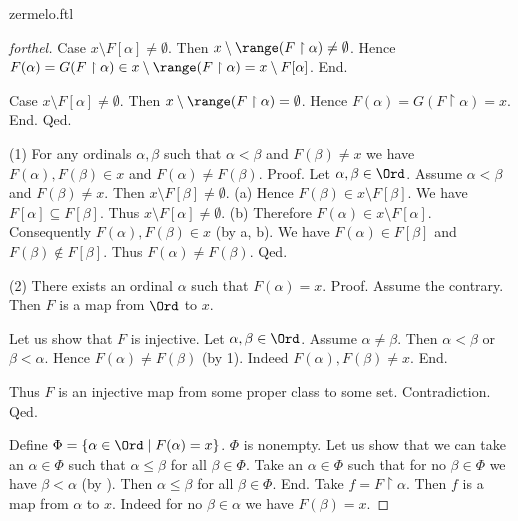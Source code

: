 \documentclass{naproche-library}
\begin{document}
\begin{smodule}{zermelo.ftl}
\begin{proof}[forthel]
      Case $x \setminus F[\alpha] \neq \emptyset$.
        Then $x \setminus \range(F \restriction \alpha) \neq \emptyset$.
        Hence $F(\alpha)
          = G(F \restriction \alpha)
          \in x \setminus \range(F \restriction \alpha)
          = x \setminus F[\alpha]$.
      End.

      Case $x \setminus F[\alpha] \neq \emptyset$.
        Then $x \setminus \range(F \restriction \alpha) = \emptyset$.
        Hence $F(\alpha)
          = G(F \restriction \alpha)
          = x$.
      End.
    Qed.

    (1) For any ordinals $\alpha, \beta$ such that $\alpha < \beta$ and $F(\beta) \neq x$ we have $F(\alpha), F(\beta) \in x$ and $F(\alpha) \neq F(\beta)$. \newline
    Proof.
      Let $\alpha, \beta \in \Ord$.
      Assume $\alpha < \beta$ and $F(\beta) \neq x$.
      Then $x \setminus F[\beta] \neq \emptyset$.
      (a) Hence $F(\beta) \in x \setminus F[\beta]$.
      We have $F[\alpha] \subseteq F[\beta]$.
      Thus $x \setminus F[\alpha] \neq \emptyset$.
      (b) Therefore $F(\alpha) \in x \setminus F[\alpha]$.
      Consequently $F(\alpha), F(\beta) \in x$ (by a, b).
      We have $F(\alpha) \in F[\beta]$ and $F(\beta) \notin F[\beta]$.
      Thus $F(\alpha) \neq F(\beta)$.
    Qed.

    (2) There exists an ordinal $\alpha$ such that $F(\alpha) = x$. \newline
    Proof.
      Assume the contrary.
      Then $F$ is a map from $\Ord$ to $x$.

      Let us show that $F$ is injective.
        Let $\alpha, \beta \in \Ord$.
        Assume $\alpha \neq \beta$.
        Then $\alpha < \beta$ or $\beta < \alpha$.
        Hence $F(\alpha) \neq F(\beta)$ (by 1).
        Indeed $F(\alpha), F(\beta) \neq x$.
      End.

      Thus $F$ is an injective map from some proper class to some set.
      Contradiction.
    Qed.

    Define $\Phi = \{ \alpha \in \Ord \mid F(\alpha) = x \}$.
    $\Phi$ is nonempty.
    Let us show that we can take an $\alpha \in \Phi$ such that $\alpha \leq \beta$ for all $\beta \in \Phi$.
      Take an $\alpha \in \Phi$ such that for no $\beta \in \Phi$ we have $\beta < \alpha$ (by ).
      Then $\alpha \leq \beta$ for all $\beta \in \Phi$.
    End.
    Take $f = F \restriction \alpha$.
    Then $f$ is a map from $\alpha$ to $x$.
    Indeed for no $\beta \in \alpha$ we have $F(\beta) = x$.


\end{proof}
\end{smodule}
\end{document}
